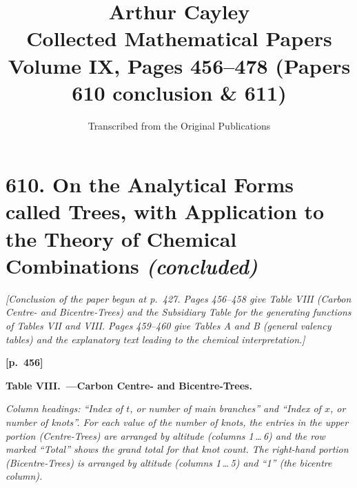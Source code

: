 \documentclass[11pt,a4paper]{article}
\title{\textbf{Arthur Cayley}\\\vspace{0.5em}
\Large Collected Mathematical Papers\\\vspace{0.3em}
\large Volume IX, Pages 456--478 (Papers 610 conclusion \& 611)}
\author{Transcribed from the Original Publications}
\date{}
\begin{document}
\maketitle
\thispagestyle{empty}

\tableofcontents
\newpage

\section*{\textbf{610.} On the Analytical Forms called Trees, with Application to the Theory of Chemical Combinations \textit{(concluded)}}

\textit{[Conclusion of the paper begun at p.~427.   Pages 456--458 give Table VIII (Carbon Centre- and Bicentre-Trees) and the Subsidiary Table for the generating functions of Tables VII and VIII.   Pages 459--460 give Tables A and B (general valency tables) and the explanatory text leading to the chemical interpretation.]}

\bigskip

\noindent\textbf{[p.~456]}\quad

\begin{center}
\textbf{Table VIII.\ ---Carbon Centre- and Bicentre-Trees.}
\end{center}

\noindent\textit{Column headings: ``Index of $t$, or number of main branches'' and ``Index of $x$, or number of knots''.   For each value of the number of knots, the entries in the upper portion (Centre-Trees) are arranged by altitude (columns 1\,\dots\,6) and the row marked ``Total'' shows the grand total for that knot count.   The right-hand portion (Bicentre-Trees) is arranged by altitude (columns 1\,\dots\,5) and ``1'' (the bicentre column).}

\medskip
\end{document}
